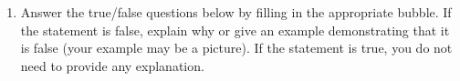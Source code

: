 \documentclass{article}
\begin{document}
\begin{enumerate}
  
\item
  \label{spring2007-midterm2-6} 


  Answer the true/false questions below by filling in the appropriate
  bubble.  If the statement is false, explain why or give an example
  demonstrating that it is false (your example may be a picture).  If the
  statement is true, you do not need to provide any explanation.


\end{enumerate}
\end{document}
